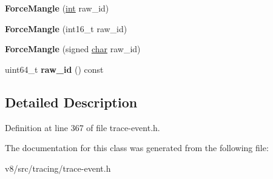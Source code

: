 \begin{DoxyCompactItemize}
{\bfseries Force\+Mangle} (\mbox{\hyperlink{classint}{int}} raw\+\_\+id)
\item 
\mbox{\label{classv8_1_1internal_1_1tracing_1_1TraceID_1_1ForceMangle_a85c44b400d7e54b08702395a33a7cb76}} 
{\bfseries Force\+Mangle} (int16\+\_\+t raw\+\_\+id)
\item 
\mbox{\label{classv8_1_1internal_1_1tracing_1_1TraceID_1_1ForceMangle_a89c6aa5a92c88f1d8b42f744af1d21c6}} 
{\bfseries Force\+Mangle} (signed \mbox{\hyperlink{classchar}{char}} raw\+\_\+id)
\item 
\mbox{\label{classv8_1_1internal_1_1tracing_1_1TraceID_1_1ForceMangle_a0250bda522f0f89e74d4f3b7149cea72}} 
uint64\+\_\+t {\bfseries raw\+\_\+id} () const
\end{DoxyCompactItemize}


\subsection{Detailed Description}


Definition at line 367 of file trace-\/event.\+h.



The documentation for this class was generated from the following file\+:\begin{DoxyCompactItemize}
\item 
v8/src/tracing/trace-\/event.\+h\end{DoxyCompactItemize}
